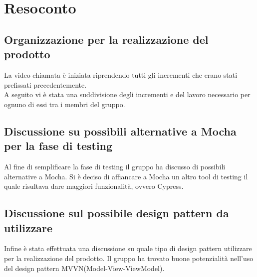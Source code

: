 \section{Resoconto}
\subsection{Organizzazione per la realizzazione del prodotto}
La video chiamata è iniziata riprendendo tutti gli incrementi che erano stati prefissati precedentemente.\\
A seguito vi è stata una suddivisione degli incrementi e del lavoro necessario per ognuno di essi tra i membri del gruppo.
\subsection{Discussione su possibili alternative a Mocha per la fase di testing}
Al fine di semplificare la fase di testing il gruppo ha discusso di possibili alternative a Mocha. Si è deciso di affiancare a Mocha un altro tool di testing il quale risultava dare maggiori funzionalità, ovvero Cypress.
\subsection{Discussione sul possibile design pattern da utilizzare}
Infine è stata effettuata una discussione su quale tipo di design pattern utilizzare per la realizzazione del prodotto. Il gruppo ha trovato buone potenzialità nell'uso del design pattern MVVN(Model-View-ViewModel).